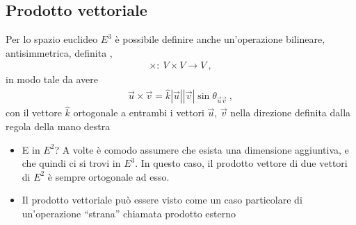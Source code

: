 \documentclass[letterpaper,10pt,english]{jupyterBook}
\begin{document}
\subsection{Prodotto vettoriale}
\label{\detokenize{ch/algebra/vector-algebra-euclidean-space:prodotto-vettoriale}}
\sphinxAtStartPar
Per lo spazio euclideo \(E^3\) è possibile definire anche un’operazione bilineare, antisimmetrica, definita ,
\begin{equation*}
\begin{split}\times: \ V \times V \rightarrow V \ ,\end{split}
\end{equation*}
\sphinxAtStartPar
in modo tale da avere
\begin{equation*}
\begin{split}\vec{u} \times \vec{v} = \hat{k} |\vec{u}| |\vec{v}| \sin \theta_{\vec{u} \vec{v}} \ ,\end{split}
\end{equation*}
\sphinxAtStartPar
con il vettore \(\hat{k}\) ortogonale a entrambi i vettori \(\vec{u}\), \(\vec{v}\) nella direzione definita dalla regola della mano destra 
\begin{itemize}
\item {} 
\sphinxAtStartPar
{} E in \(E^2\)? A volte è comodo assumere che esista una dimensione aggiuntiva, e che quindi ci si trovi in \(E^3\). In questo caso, il prodotto vettore di due vettori di \(E^2\) è sempre ortogonale ad esso.

\item {} 
\sphinxAtStartPar
{} Il prodotto vettoriale può essere visto come un caso particolare di un’operazione “strana” chiamata prodotto esterno

\end{itemize}
\end{document}
